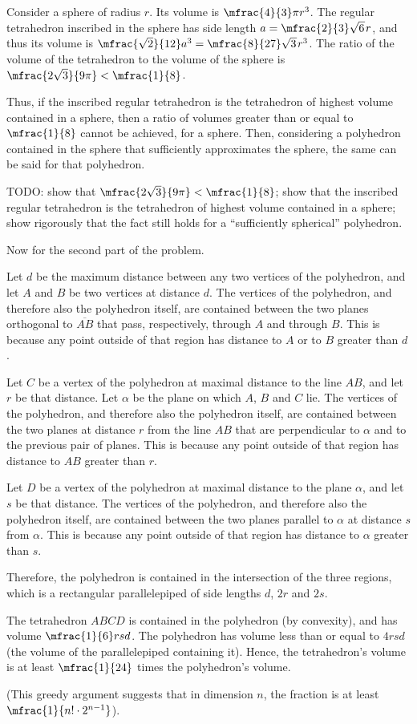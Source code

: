 Consider a sphere of radius $r$.
Its volume is $\mfrac{4}{3} \pi r^3$.
The regular tetrahedron inscribed in the sphere has side length $a = \mfrac{2}{3} \sqrt{6 \mspace{1mu}} \mspace{1mu} r$,
and thus its volume is $\mfrac{\sqrt{2}}{12} a^3 = \mfrac{8}{27} \sqrt{3 \mspace{1mu}} \mspace{1mu} r^3$.
The ratio of the volume of the tetrahedron to the volume of the sphere is $\mfrac{2 \sqrt{3}}{9 \pi} < \mfrac{1}{8}$.

Thus, if the inscribed regular tetrahedron is the tetrahedron of highest volume contained in a sphere,
then a ratio of volumes greater than or equal to $\mfrac{1}{8}$ cannot be achieved, for a sphere.
Then, considering a polyhedron contained in the sphere that sufficiently approximates the sphere,
the same can be said for that polyhedron.

TODO: show that $\mfrac{2 \sqrt{3}}{9 \pi} < \mfrac{1}{8}$;
show that the inscribed regular tetrahedron is the tetrahedron of highest volume contained in a sphere;
show rigorously that the fact still holds for a ``sufficiently spherical'' polyhedron.

\vspace{1ex}

Now for the second part of the problem.

Let $d$ be the maximum distance between any two vertices of the polyhedron,
and let $A$ and $B$ be two vertices at distance $d$.
The vertices of the polyhedron, and therefore also the polyhedron itself,
are contained between the two planes orthogonal to $\overline{AB}$ that pass, respectively, through $A$ and through $B$.
This is because any point outside of that region has distance to $A$ or to $B$ greater than $d$.

Let $C$ be a vertex of the polyhedron at maximal distance to the line $AB$,
and let $r$ be that distance.
Let $\alpha$ be the plane on which $A$, $B$ and $C$ lie.
The vertices of the polyhedron, and therefore also the polyhedron itself,
are contained between the two planes at distance $r$ from the line $AB$ that are perpendicular to $\alpha$ and to the previous pair of planes.
This is because any point outside of that region has distance to $AB$ greater than $r$.

Let $D$ be a vertex of the polyhedron at maximal distance to the plane $\alpha$,
and let $s$ be that distance.
The vertices of the polyhedron, and therefore also the polyhedron itself,
are contained between the two planes parallel to $\alpha$ at distance $s$ from $\alpha$.
This is because any point outside of that region has distance to $\alpha$ greater than $s$.

Therefore, the polyhedron is contained in the intersection of the three regions,
which is a rectangular parallelepiped of side lengths $d$, $2 r$ and $2 s$.

The tetrahedron $ABCD$ is contained in the polyhedron (by convexity),
and has volume $\mfrac{1}{6} r s d$.
The polyhedron has volume less than or equal to $4 r s d$ (the volume of the parallelepiped containing it).
Hence, the tetrahedron's volume is at least $\mfrac{1}{24}$ times the polyhedron's volume.

(This greedy argument suggests that in dimension $n$, the fraction is at least $\mfrac{1}{n! \cdot 2^{n - 1}}$).
